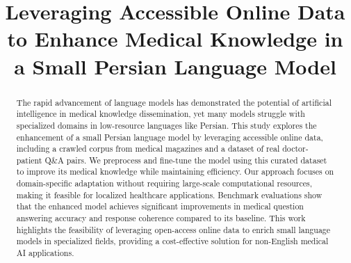 \documentclass[conference]{IEEEtran}
\begin{document}
\title{Leveraging Accessible Online Data to Enhance Medical Knowledge in a Small Persian Language Model}

\author{
\and
{}
\and
{}
\and
{}
\and
{}
}

\maketitle

\begin{abstract}
The rapid advancement of language models has demonstrated the potential of artificial intelligence in medical knowledge dissemination, yet many models struggle with specialized domains in low-resource languages like Persian. This study explores the enhancement of a small Persian language model by leveraging accessible online data, including a crawled corpus from medical magazines and a dataset of real doctor-patient Q\&A pairs. We preprocess and fine-tune the model using this curated dataset to improve its medical knowledge while maintaining efficiency. Our approach focuses on domain-specific adaptation without requiring large-scale computational resources, making it feasible for localized healthcare applications. Benchmark evaluations show that the enhanced model achieves significant improvements in medical question answering accuracy and response coherence compared to its baseline. This work highlights the feasibility of leveraging open-access online data to enrich small language models in specialized fields, providing a cost-effective solution for non-English medical AI applications.
\end{abstract}
\end{document}
